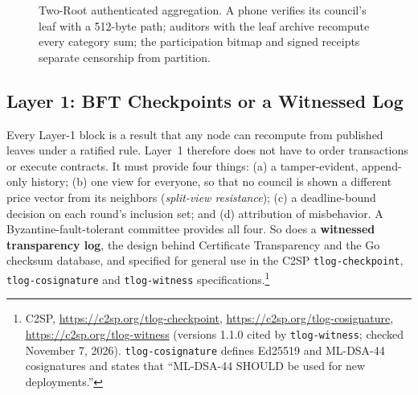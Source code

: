 \documentclass[10pt,twoside,openany]{book}
\theoremstyle{dpepstyle}
\begin{document}
\begin{figure}[htbp]
\caption{Two-Root authenticated aggregation. A phone verifies its council's leaf with a 512-byte path; auditors with the leaf archive recompute every category sum; the participation bitmap and signed receipts separate censorship from partition.}
\label{fig:two-root}
\end{figure}

\subsection{Layer 1: BFT Checkpoints or a Witnessed Log}
\label{sec:layer1-options}

Every Layer-1 block is a result that any node can recompute from published leaves under a ratified rule. Layer~1 therefore does not have to order transactions or execute contracts. It must provide four things: (a) a tamper-evident, append-only history; (b) one view for everyone, so that no council is shown a different price vector from its neighbors (\emph{split-view resistance}); (c) a deadline-bound decision on each round's inclusion set; and (d) attribution of misbehavior. A Byzantine-fault-tolerant committee provides all four. So does a \textbf{witnessed transparency log}, the design behind Certificate Transparency and the Go checksum database, and specified for general use in the C2SP \texttt{tlog-checkpoint}, \texttt{tlog-cosignature} and \texttt{tlog-witness} specifications.\footnote{C2SP, \url{https://c2sp.org/tlog-checkpoint}, \url{https://c2sp.org/tlog-cosignature}, \url{https://c2sp.org/tlog-witness} (versions 1.1.0 cited by \texttt{tlog-witness}; checked November 7, 2026). \texttt{tlog-cosignature} defines Ed25519 and ML-DSA-44 cosignatures and states that ``ML-DSA-44 SHOULD be used for new deployments.''}
\end{document}
